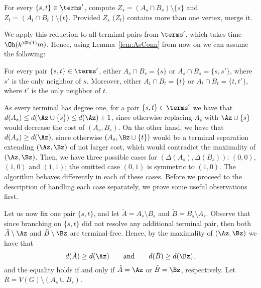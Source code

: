 \begin{reductionstep}
For every $\{s,t\}\in \terms'$, compute $Z_s=(A_s\cap B_s)\setminus \{s\}$ and $Z_t=(A_t\cap B_t)\setminus \{t\}$. Provided $Z_s$ ($Z_t$) contains more than one vertex, merge it.
\end{reductionstep}

We apply this reduction to all terminal pairs from $\terms'$, which takes time $\Oh(k^{\Oh(1)} m)$. Hence, using Lemma~\ref{lem:AsConn} from now on we can assume the following:

\begin{assumption}\label{ass:small-intersections}
For every pair $\{s,t\}\in \terms'$, either $A_s\cap B_s=\{s\}$ or $A_s\cap B_s=\{s,s'\}$, where $s'$ is the only neighbor of $s$. Moreover, either $A_t\cap B_t=\{t\}$ or $A_t\cap B_t=\{t,t'\}$, where $t'$ is the only neighbor of $t$.
\end{assumption}

As every terminal has degree one, for a pair $\{s,t\}\in \terms'$ we have that $d(A_s)\leq d(\Az\cup \{s\})\leq d(\Az)+1$, since otherwise replacing $A_s$ with $\Az\cup \{s\}$ would decrease the cost of $(A_s,B_s)$. On the other hand, we have that $d(A_s)\geq d(\Az)$, since otherwise $(A_s,\Bz\cup \{t\})$ would be a terminal separation extending $(\Az,\Bz)$ of not larger cost, which would contradict the maximality of $(\Az,\Bz)$. Then, we have three possible cases for $(\Delta(A_s),\Delta(B_s))$: $(0,0)$, $(1,0)$ and $(1,1)$; the omitted case $(0,1)$ is symmetric to $(1,0)$. The algorithm behaves differently in each of these cases. Before we proceed to the description of handling each case separately, we prove some useful observations first.

\newcommand{\Atr}{\tilde{A}}
\newcommand{\Btr}{\tilde{B}}

Let us now fix one pair $\{s,t\}$, and let $\Atr=A_s\setminus B_s$ and $\Btr = B_s\setminus A_s$. Observe that since branching on $\{s,t\}$ did not resolve any additional terminal pair, then both $\Atr \setminus \Az$ and $\Btr \setminus \Bz$ are terminal-free. Hence, by the maximality of $(\Az,\Bz)$ we have that
\begin{equation}\label{eq:truncs}
d(\Atr)\geq d(\Az) \qquad \text{and}\qquad d(\Btr)\geq d(\Bz),
\end{equation}
and the equality holds if and only if $\Atr=\Az$ or $\Btr=\Bz$, respectively. Let $R=V(G)\setminus (A_s\cup B_s)$.

